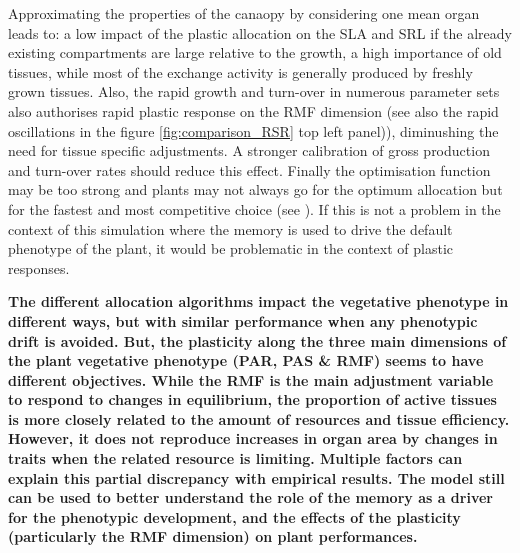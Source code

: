 Approximating the properties of the canaopy by considering one mean organ leads to: a low impact of the plastic allocation on the SLA and SRL if the already existing compartments are large relative to the growth, a high importance of old tissues, while most of the exchange activity is generally produced by freshly grown tissues. Also, the rapid growth and turn-over in numerous parameter sets also authorises rapid plastic response on the RMF dimension (see also the rapid oscillations in the figure \ref{fig:comparison_RSR} top left panel)), diminushing the need for tissue specific adjustments. A stronger calibration of gross production and turn-over rates should reduce this effect. Finally the optimisation function may be too strong and plants may not always go for the optimum allocation but for the fastest and most competitive choice (see \cite{farrior_resource_2011,dybzinski_evolutionarily_2011, farrior_competitive_2014}). If this is not a problem in the context of this simulation where the memory is used to drive the default phenotype of the plant, it would be problematic in the context of plastic responses.
%




%
%
%



\textbf{The different allocation algorithms impact the vegetative phenotype in different ways, but with similar performance when any phenotypic drift is avoided. But, the plasticity along the three main dimensions of the plant vegetative phenotype (PAR, PAS \& RMF) seems to have different objectives. While the RMF is the main adjustment variable to respond to changes in equilibrium, the proportion of active tissues is more closely related to the amount of resources and tissue efficiency.  However, it does not reproduce increases in organ area by changes in traits when the related resource is limiting. Multiple factors can explain this partial discrepancy with empirical results. The model still can be used to better understand the role of the memory as a driver for the phenotypic development, and the effects of the plasticity (particularly the RMF dimension) on plant performances.}

